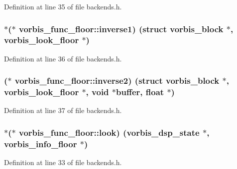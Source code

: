 Definition at line 35 of file backends.\+h.

\subsubsection[{\texorpdfstring{inverse1}{inverse1}}]{$\ast$($\ast$ vorbis\+\_\+func\+\_\+floor\+::inverse1) (struct {\bf vorbis\+\_\+block} $\ast$, {\bf vorbis\+\_\+look\+\_\+floor} $\ast$)}\hypertarget{structvorbis__func__floor_a2c928191b9252196325df911d54098d5}{}\label{structvorbis__func__floor_a2c928191b9252196325df911d54098d5}


Definition at line 36 of file backends.\+h.

\subsubsection[{\texorpdfstring{inverse2}{inverse2}}]{($\ast$ vorbis\+\_\+func\+\_\+floor\+::inverse2) (struct {\bf vorbis\+\_\+block} $\ast$, {\bf vorbis\+\_\+look\+\_\+floor} $\ast$, {\bf void} $\ast${\bf buffer}, float $\ast$)}\hypertarget{structvorbis__func__floor_aabcd133bf6e6bd74664012cfd52c072c}{}\label{structvorbis__func__floor_aabcd133bf6e6bd74664012cfd52c072c}


Definition at line 37 of file backends.\+h.

\subsubsection[{\texorpdfstring{look}{look}}]{$\ast$($\ast$ vorbis\+\_\+func\+\_\+floor\+::look) ({\bf vorbis\+\_\+dsp\+\_\+state} $\ast$, {\bf vorbis\+\_\+info\+\_\+floor} $\ast$)}\hypertarget{structvorbis__func__floor_a2636469b885c836e2f18fd250638e1d7}{}\label{structvorbis__func__floor_a2636469b885c836e2f18fd250638e1d7}


Definition at line 33 of file backends.\+h.

